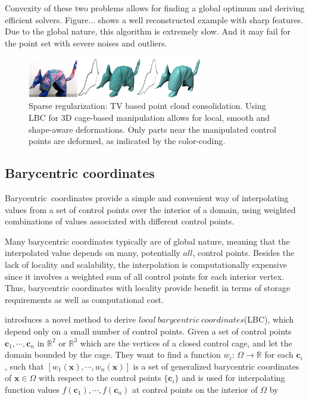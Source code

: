 Convexity of these two problems allows for finding a global optimum and deriving efficient solvers.
Figure... shows a well reconstructed example with sharp features.
Due to the global nature, this algorithm is extremely slow.
And it may fail for the point set with severe noises and outliers.

\begin{figure}[ht]
  \centering
  \includegraphics[width=3in]{images/TV_consolidation}
  \caption{Sparse regularization: TV based point cloud consolidation\cite{lipman2007parameterization}. Using LBC for 3D cage-based manipulation allows for local, smooth and shape-aware deformations. Only parts near the manipulated control points are deformed, as indicated by the color-coding.}
  \label{fig:TV consolidation}
\end{figure}


\subsection{Barycentric coordinates}
\label{subsec:Barycentric coordinates}

Barycentric~coordinates provide a simple and convenient way of interpolating values from a set of control points over the interior of a domain, using weighted combinations of values associated with different control points.

Many barycentric coordinates typically are of global nature, meaning that the interpolated value depends on many, potentially $all$, control points. Besides the lack of locality and scalability, the interpolation is computationally expensive since it involves a weighted sum of all control points for each interior vertex.
Thus, barycentric coordinates with locality provide benefit in terms of storage requirements as well as computational cost.

\cite{zhang2014local} introduces a novel method to derive $local~barycentric~coordinates$(LBC), which depend only on a small number of control points.
Given a set of control points $\mathbf{c}_1, \cdots, \mathbf{c}_n$ in $\mathbb{R}^2$ or  $\mathbb{R}^3$ which are the vertices of a closed control cage, and let the domain bounded by the cage.
They want to find a function $w_{i}$: $\Omega\rightarrow\mathbb{R}$ for each $\mathbf{c}_{i}$, such that $[w_1(\mathbf{x}), \cdots, w_n(\mathbf{x})]$ is a set of generalized barycentric coordinates of $\mathbf{x}\in\Omega$ with respect to the control points $\{\mathbf{c}_{i}\}$ and is used for interpolating function values $f(\mathbf{c}_1), \cdots, f(\mathbf{c}_n)$ at control points on the interior of $\Omega$ by


